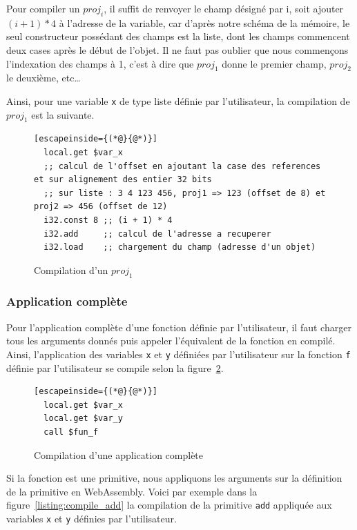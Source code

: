 \documentclass{rapportECL}
\begin{document}
Pour compiler un $proj_i$, il suffit de renvoyer le champ désigné par i, soit ajouter $(i + 1)*4$ à l'adresse de la variable, car
d'après notre schéma de la mémoire, le seul constructeur possédant des champs est la liste, dont les champs commencent deux cases 
après le début de l'objet.
Il ne faut pas oublier que nous commençons l'indexation des champs à 1, c'est à dire que $proj_1$ donne le premier champ, 
$proj_2$ le deuxième, etc\dots

Ainsi, pour une variable \verb|x| de type liste définie par l'utilisateur, la compilation de $proj_1$ est la suivante.
\begin{figure}[H]
	\begin{lstlisting}[escapeinside={(*@}{@*)}]
  local.get $var_x
  ;; calcul de l'offset en ajoutant la case des references et sur alignement des entier 32 bits
  ;; sur liste : 3 4 123 456, proj1 => 123 (offset de 8) et proj2 => 456 (offset de 12)
  i32.const 8 ;; (i + 1) * 4
  i32.add     ;; calcul de l'adresse a recuperer
  i32.load    ;; chargement du champ (adresse d'un objet)
\end{lstlisting}
\caption{Compilation d'un $proj_1$}
\label{listing:compile_proj}
\end{figure}

\subsubsection{Application complète}

Pour l'application complète d'une fonction définie par l'utilisateur, il faut charger tous les arguments donnés puis appeler 
l'équivalent de la fonction en compilé. Ainsi, l'application des variables \verb|x| et \verb|y| définiées par l'utilisateur sur 
la fonction \verb|f| définie par l'utilisateur se compile selon la figure~\ref*{listing:compile_app_comp_const}.

\begin{figure}[H]
	\begin{lstlisting}[escapeinside={(*@}{@*)}]
  local.get $var_x
  local.get $var_y
  call $fun_f
	\end{lstlisting}
	\caption{Compilation d'une application complète}
	\label{listing:compile_app_comp_const}
\end{figure}

Si la fonction est une primitive, nous appliquons les arguments sur la définition de la primitive en WebAssembly.
Voici par exemple dans la figure~\ref*{listing:compile_add} la compilation de la primitive \verb|add| appliquée aux variables 
\verb|x| et \verb|y| définies par l'utilisateur.
\end{document}
